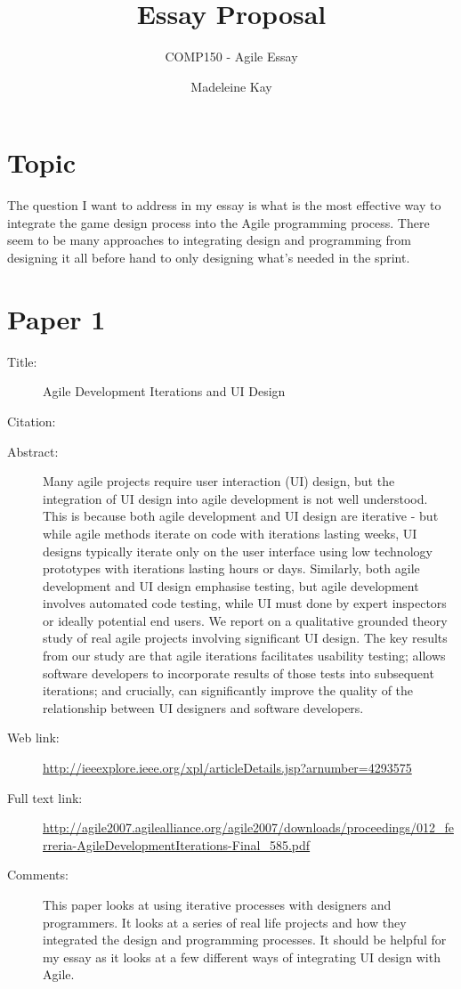 \documentclass{scrartcl}
\title{Essay Proposal}
\subtitle{COMP150 - Agile Essay}
\author{Madeleine Kay}
\begin{document}
\maketitle

\section*{Topic}
The question I want to address in my essay is what is the most effective way to integrate the game design process into the Agile programming process. There seem to be many approaches to integrating design and programming from designing it all before hand to only designing what's needed in the sprint.

\section*{Paper 1}
\begin{description}
	\item[Title:] Agile Development Iterations and UI Design	
	\item[Citation:] \cite{Ferreira}
	\item[Abstract:] Many agile projects require user interaction (UI) design, but the integration of UI design into agile development is not well understood. This is because both agile development and UI design are iterative - but while agile methods iterate on code with iterations lasting weeks, UI designs typically iterate only on the user interface using low technology prototypes with iterations lasting hours or days. Similarly, both agile development and UI design emphasise testing, but agile development involves automated code testing, while UI must done by expert inspectors or ideally potential end users. We report on a qualitative grounded theory study of real agile projects involving significant UI design. The key results from our study are that agile iterations facilitates usability testing; allows software developers to incorporate results of those tests into subsequent iterations; and crucially, can significantly improve the quality of the relationship between UI designers and software developers.
	\item[Web link:] \url{http://ieeexplore.ieee.org/xpl/articleDetails.jsp?arnumber=4293575}
	\item[Full text link:] \url{http://agile2007.agilealliance.org/agile2007/downloads/proceedings/012_ferreria-AgileDevelopmentIterations-Final_585.pdf}
	\item[Comments:]  This paper looks at using iterative processes with designers and programmers. It looks at a series of real life projects and how they integrated the design and programming processes. It should be helpful for my essay as it looks at a few different ways of integrating UI design with Agile.
\end{description}
\end{document}
